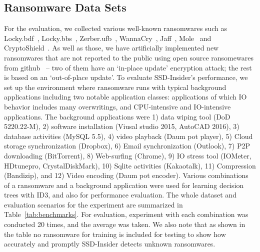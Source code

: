 \documentclass[conference]{IEEEtran}
\newcommand{\ours}{SSD-Insider}
\begin{document}
\subsection{Ransomware Data Sets}
For the evaluation, we collected various well-known ransomwares such as 
Locky.bdf~\cite{lockybdf}, Locky.bbs~\cite{lockybbs}, Zerber.ufb~\cite{zerber}, 
WannaCry~\cite{wannacry}, Jaff~\cite{jaff}, Mole~\cite{mole} and CryptoShield~\cite{cryptoshield}. 
As well as those, we have artificially implemented new ransomwares that are not
reported to the public using open source ransomewares from github~\cite{virgang,poc}
-- two of them have an `in-place update' encryption attack; the rest is based on an `out-of-place update'.
To evaluate \ours{}'s performance,
we set up the environment where ransomware runs with typical background applications 
including two notable application classes: applications of which IO behavior includes many overwritings, 
and CPU-intensive and IO-intensive applications. The background applications were 
1) data wiping tool (DoD 5220.22-M), 2) software installation (Viusal studio 2015, AutoCAD 2016),  
3) database activities (MySQL 5.5), 
4) video playback (Daum pot player), 5) Cloud storage synchronization (Dropbox), 
6) Email synchronization (Outlook), 7) P2P downloading (BitTorrent), 
8) Web-surfing (Chrome), 9) IO stress tool (IOMeter, HDtunepro, CrystalDiskMark), 
10) Sqlite activities (Kakaotalk), 11) Compression (Bandizip), and 
12) Video encoding (Daum pot encoder). 
Various combinations of a ransomware and a background application were used 
for learning decision trees with ID3, and also for performance evaluation. 
The whole dataset and evaluation scenarios for the experiment are summarized in Table~\ref{tab:benchmarks}. 
For evaluation, experiment with each combination was conducted 20 times, and the average was taken.
We also note that as shown in the table no ransomware for training is included for testing to show 
how accurately and promptly \ours{} detects unknown ransomwares.
\end{document}
